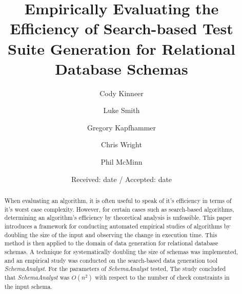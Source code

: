 \documentclass[smallextended]{svjour3}       %
\begin{document}
\title{Empirically Evaluating the Efficiency of Search-based Test Suite
Generation for Relational Database Schemas}



\author{Cody Kinneer         \and
        Luke Smith \and
        Gregory Kapfhammer \and
        Chris Wright \and
        Phil McMinn
}



\date{Received: date / Accepted: date}


\maketitle

\begin{abstract}
When evaluating an algorithm, it is often useful to speak of it's
efficiency in terms of it's worst case complexity.  However, for certain
cases such as search-based algorithms, determining an algorithm's
efficiency by theoretical analysis is unfeasible.  This paper introduces a
framework for conducting automated empirical studies of algorithms by
doubling the size of the input and observing the change in execution
time. This method is then applied to the domain of data generation for
relational database schemas. A technique for systematically doubling the
size of schemas was implemented, and an empirical study was conducted on
the search-based data generation tool \textit{SchemaAnalyst}. For the
parameters of \textit{SchemaAnalyst} tested,  The study
concluded that \textit{SchemaAnalyst} was $O(n^2)$ with respect to the
number of check constraints in the input schema.


\end{abstract}
\end{document}
